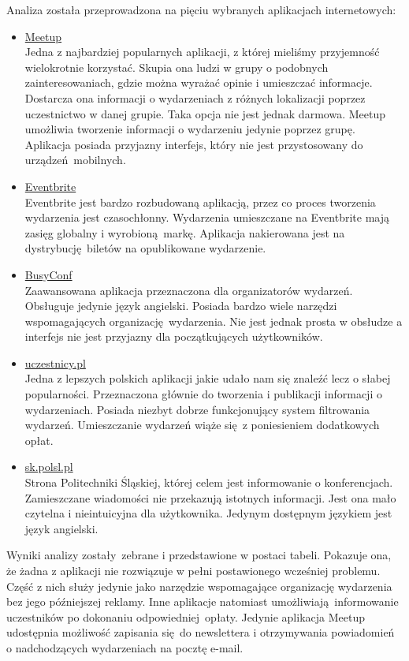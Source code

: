Analiza została przeprowadzona na pięciu wybranych aplikacjach internetowych:
\begin{itemize}
  \item \href{http://www.meetup.com/}{Meetup} \\
  Jedna z najbardziej popularnych aplikacji, z której mieliśmy przyjemność wielokrotnie korzystać. Skupia ona ludzi w grupy o podobnych zainteresowaniach, gdzie można wyrażać opinie i umieszczać informacje. Dostarcza ona informacji o wydarzeniach z różnych lokalizacji poprzez uczestnictwo w danej grupie. Taka opcja nie jest jednak darmowa. Meetup umożliwia tworzenie informacji o wydarzeniu jedynie poprzez grupę. Aplikacja posiada przyjazny interfejs, który nie jest przystosowany do urządzeń mobilnych.
  \item \href{https://www.eventbrite.com/}{Eventbrite} \\
  Eventbrite jest bardzo rozbudowaną aplikacją, przez co proces tworzenia wydarzenia jest czasochłonny. Wydarzenia umieszczane na Eventbrite mają zasięg globalny i wyrobioną markę. Aplikacja nakierowana jest na dystrybucję biletów na opublikowane wydarzenie.
  \item \href{http://busyconf.com/}{BusyConf} \\
  Zaawansowana aplikacja przeznaczona dla organizatorów wydarzeń. Obsługuje jedynie język angielski. Posiada bardzo wiele narzędzi wspomagających organizację wydarzenia. Nie jest jednak prosta w obsłudze a interfejs nie jest przyjazny dla początkujących użytkowników.
  \item \href{http://www.uczestnicy.pl/}{uczestnicy.pl} \\
  Jedna z lepszych polskich aplikacji jakie udało nam się znaleźć lecz o słabej popularności. Przeznaczona głównie do tworzenia i publikacji informacji o wydarzeniach. Posiada niezbyt dobrze funkcjonujący system filtrowania wydarzeń. Umieszczanie wydarzeń wiąże się z poniesieniem dodatkowych opłat.
  \item \href{http://sk.polsl.pl/}{sk.polsl.pl} \\
  Strona Politechniki Śląskiej, której celem jest informowanie o konferencjach. Zamieszczane wiadomości nie przekazują istotnych informacji. Jest ona mało czytelna i nieintuicyjna dla użytkownika. Jedynym dostępnym językiem jest język angielski.
\end{itemize}


Wyniki analizy zostały zebrane i przedstawione w postaci tabeli. Pokazuje ona, że żadna z aplikacji nie rozwiązuje w pełni postawionego wcześniej problemu. Część z nich służy jedynie jako narzędzie wspomagające organizację wydarzenia bez jego późniejszej reklamy. Inne aplikacje natomiast umożliwiają informowanie uczestników po dokonaniu odpowiedniej opłaty. Jedynie aplikacja Meetup udostępnia możliwość zapisania się do newslettera i otrzymywania powiadomień o nadchodzących wydarzeniach na pocztę e-mail.

